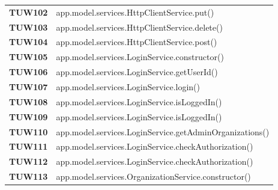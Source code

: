 \documentclass[../../piano-di-qualifica.tex]{subfiles}
\begin{document}
\begin{longtable}[H]{>{\centering\bfseries}m{3cm} >{}m{13cm}}
  TUW102             & app.model.services.HttpClientService.put\@()                                                            \\

  TUW103             & app.model.services.HttpClientService.delete\@()                                                         \\

  TUW104             & app.model.services.HttpClientService.post\@()                                                           \\




  TUW105             & app.model.services.LoginService.constructor\@()                                                         \\

  TUW106             & app.model.services.LoginService.getUserId\@()                                                           \\

  TUW107             & app.model.services.LoginService.login\@()                                                               \\

  TUW108             & app.model.services.LoginService.isLoggedIn\@()                                                          \\

  TUW109             & app.model.services.LoginService.isLoggedIn\@()                                                          \\

  TUW110             & app.model.services.LoginService.getAdminOrganizations\@()                                               \\

  TUW111             & app.model.services.LoginService.checkAuthorization\@()                                                  \\

  TUW112             & app.model.services.LoginService.checkAuthorization\@()                                                  \\


  TUW113             & app.model.services.OrganizationService.constructor\@()                                                  \\


\end{longtable}
\end{document}
